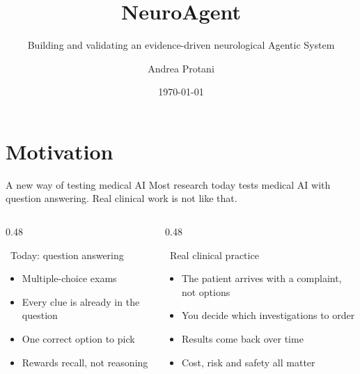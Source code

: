 \documentclass[aspectratio=169,t]{beamer}
\title{NeuroAgent}
\subtitle{Building and validating an evidence-driven neurological Agentic System}
\author{Andrea Protani}
\date{\today}
\begin{document}
\maketitle

\section{Motivation}

\begin{frame}{A new way of testing medical AI}
  \centering\footnotesize\color{CERNtextdark}
  Most research today tests medical AI with \alert{question answering}.
  Real clinical work is not like that.

  \vspace{2mm}
  \begin{columns}[T,onlytextwidth]
    \begin{column}{0.48\textwidth}
      \begin{block}{\faListOl\;\, Today: question answering}
        \footnotesize
        \begin{itemize}\setlength\itemsep{0.3em}
          \item Multiple-choice exams
          \item Every clue is already in the question
          \item One correct option to pick
          \item Rewards recall, not reasoning
        \end{itemize}
      \end{block}
    \end{column}%
    \hfill
    \begin{column}{0.48\textwidth}
      \begin{alertblock}{\faUserInjured\;\, Real clinical practice}
        \footnotesize
        \begin{itemize}\setlength\itemsep{0.3em}
          \item The patient arrives with a complaint, not options
          \item You decide which investigations to order
          \item Results come back over time
          \item Cost, risk and safety all matter
        \end{itemize}
      \end{alertblock}
    \end{column}
  \end{columns}


\end{frame}
\end{document}
